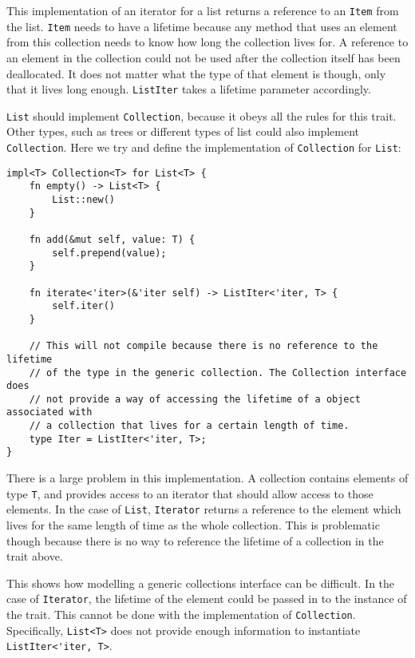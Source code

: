 This implementation of an iterator for a list returns a reference to an
\lstinline{Item} from the list. \lstinline{Item} needs to have a lifetime
because any method that uses an element from this collection needs to know how
long the collection lives for. A reference to an element in the collection
could not be used after the collection itself has been deallocated. It does not
matter what the type of that element is though, only that it lives long enough.
\lstinline{ListIter} takes a lifetime parameter accordingly.

\lstinline{List} should implement \lstinline{Collection}, because it obeys
all the rules for this trait. Other types, such as trees or different types of
list could also implement \lstinline{Collection}. Here we try and define the
implementation of \lstinline{Collection} for \lstinline{List}:

\begin{lstlisting}[nolol]
impl<T> Collection<T> for List<T> {
    fn empty() -> List<T> {
        List::new()
    }        

    fn add(&mut self, value: T) {
        self.prepend(value);
    }
    
    fn iterate<'iter>(&'iter self) -> ListIter<'iter, T> {
        self.iter()
    }
    
    // This will not compile because there is no reference to the lifetime 
    // of the type in the generic collection. The Collection interface does
    // not provide a way of accessing the lifetime of a object associated with
    // a collection that lives for a certain length of time. 
    type Iter = ListIter<'iter, T>;
}
\end{lstlisting}

There is a large problem in this implementation. A collection contains elements
of type \lstinline{T}, and provides access to an iterator that should allow
access to those elements. In the case of \lstinline{List}, \lstinline{Iterator}
returns a reference to the element which lives for the same length of time as
the whole collection. This is problematic though because there is no way to
reference the lifetime of a collection in the trait above.

This shows how modelling a generic collections interface can be difficult. In
the case of \lstinline{Iterator}, the lifetime of the element could be passed
in to the instance of the trait. This cannot be done with the implementation of
\lstinline{Collection}. Specifically, \lstinline{List<T>} does not provide
enough information to instantiate \lstinline{ListIter<'iter, T>}.

